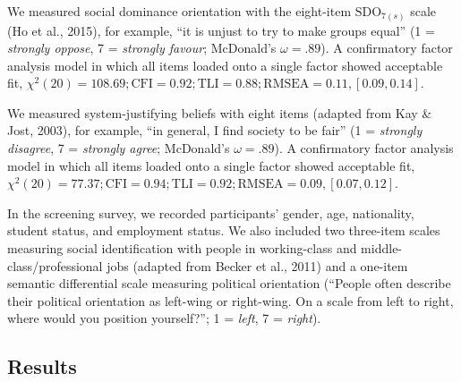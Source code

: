 \documentclass[twocolumn, 11pt, letterpaper]{article}
\begin{document}
We measured social dominance orientation with the eight-item
\(\text{SDO}_{7(s)}\) scale (Ho et al., 2015), for example, ``it is
unjust to try to make groups equal'' (1 = \emph{strongly oppose}, 7 =
\emph{strongly favour}; McDonald's \(\omega = .89\)). A confirmatory
factor analysis model in which all items loaded onto a single factor
showed acceptable fit,
\(\chi^2 (20) = 108.69; \text{CFI} = 0.92; \text{TLI} = 0.88; \text{RMSEA} = 0.11, [0.09, 0.14]\).

We measured system-justifying beliefs with eight items (adapted from Kay
\& Jost, 2003), for example, ``in general, I find society to be fair''
(1 = \emph{strongly disagree}, 7 = \emph{strongly agree}; McDonald's
\(\omega = .89\)). A confirmatory factor analysis model in which all
items loaded onto a single factor showed acceptable fit,
\(\chi^2 (20) = 77.37; \text{CFI} = 0.94; \text{TLI} = 0.92; \text{RMSEA} = 0.09, [0.07, 0.12]\).

In the screening survey, we recorded participants' gender, age,
nationality, student status, and employment status. We also included two
three-item scales measuring social identification with people in
working-class and middle-class/professional jobs (adapted from Becker et
al., 2011) and a one-item semantic differential scale measuring
political orientation (``People often describe their political
orientation as left-wing or right-wing. On a scale from left to right,
where would you position yourself?''; 1 = \emph{left}, 7 =
\emph{right}).

\hypertarget{results}{%
\subsection{Results}\label{results}}
\end{document}
